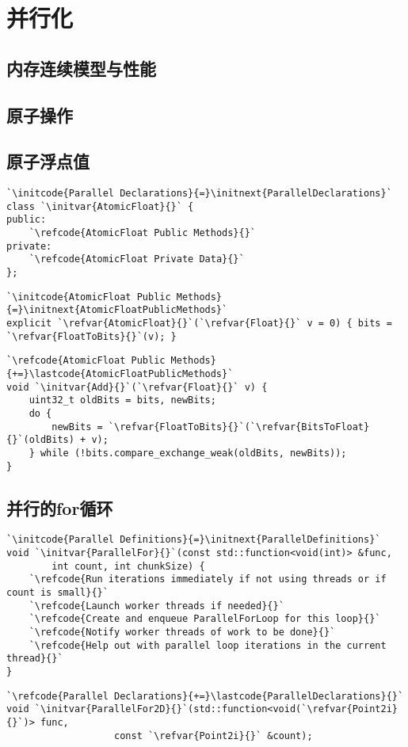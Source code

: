 \section{并行化}\label{sec:并行化}

\subsection{内存连续模型与性能}\label{sub:内存连续模型与性能}

\subsection{原子操作}\label{sub:原子操作}

\subsection{原子浮点值}\label{sub:原子浮点值}
\begin{lstlisting}
`\initcode{Parallel Declarations}{=}\initnext{ParallelDeclarations}`
class `\initvar{AtomicFloat}{}` {
public:
    `\refcode{AtomicFloat Public Methods}{}`
private:
    `\refcode{AtomicFloat Private Data}{}`
};
\end{lstlisting}
\begin{lstlisting}
`\initcode{AtomicFloat Public Methods}{=}\initnext{AtomicFloatPublicMethods}`
explicit `\refvar{AtomicFloat}{}`(`\refvar{Float}{}` v = 0) { bits = `\refvar{FloatToBits}{}`(v); }
\end{lstlisting}
\begin{lstlisting}
`\refcode{AtomicFloat Public Methods}{+=}\lastcode{AtomicFloatPublicMethods}`
void `\initvar{Add}{}`(`\refvar{Float}{}` v) {
    uint32_t oldBits = bits, newBits;
    do {
        newBits = `\refvar{FloatToBits}{}`(`\refvar{BitsToFloat}{}`(oldBits) + v);
    } while (!bits.compare_exchange_weak(oldBits, newBits));
}
\end{lstlisting}
\subsection{并行的for循环}\label{sub:并行的for循环}
\begin{lstlisting}
`\initcode{Parallel Definitions}{=}\initnext{ParallelDefinitions}`
void `\initvar{ParallelFor}{}`(const std::function<void(int)> &func,
        int count, int chunkSize) {
    `\refcode{Run iterations immediately if not using threads or if count is small}{}`
    `\refcode{Launch worker threads if needed}{}`
    `\refcode{Create and enqueue ParallelForLoop for this loop}{}`
    `\refcode{Notify worker threads of work to be done}{}`
    `\refcode{Help out with parallel loop iterations in the current thread}{}`
}
\end{lstlisting}

\begin{lstlisting}
`\refcode{Parallel Declarations}{+=}\lastcode{ParallelDeclarations}{}`
void `\initvar{ParallelFor2D}{}`(std::function<void(`\refvar{Point2i}{}`)> func,
                   const `\refvar{Point2i}{}` &count);
\end{lstlisting}